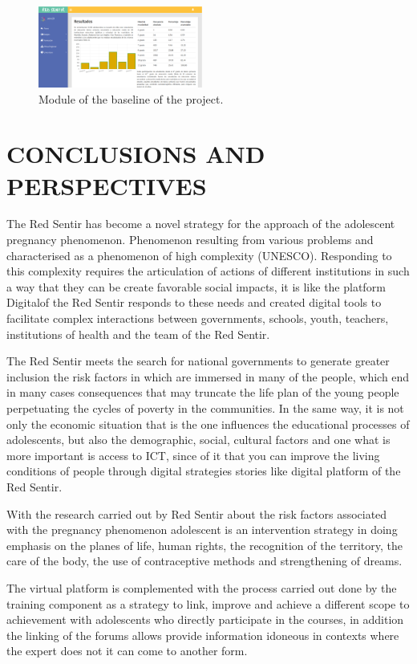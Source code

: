 \documentclass[journal,transmag]{IEEEtran}
\begin{document}
\begin{figure}[t]
\centering
\includegraphics[width=0.48\textwidth]{resultados.eps}
\caption{Module of the baseline of the project.}
\label{fig:lineabase}
\end{figure}

\section{CONCLUSIONS AND PERSPECTIVES}\label{sec:conclusiones}
The Red Sentir has become a novel strategy for the approach of the adolescent pregnancy phenomenon. Phenomenon resulting from various problems and characterised as a phenomenon of high complexity (UNESCO). Responding to this complexity requires the articulation of actions of different institutions in such a way that they can be create favorable social impacts, it is like the platform Digitalof the Red Sentir responds to these needs and created digital tools to facilitate complex interactions between governments, schools, youth, teachers, institutions of health and the team of the Red Sentir.

The Red Sentir meets the search for national governments to generate greater inclusion the risk factors in which are immersed in many of the people, which end in many cases consequences that may truncate the life plan of the young people perpetuating the cycles of poverty in the communities. In the same way, it is not only the economic situation that is the one influences the educational processes of adolescents, but also the demographic, social, cultural factors and one what is more important is access to ICT, since of it that you can improve the living conditions of people through digital strategies stories like digital platform of the Red Sentir.

With the research carried out by Red Sentir about the risk factors associated with the pregnancy phenomenon adolescent is an intervention strategy in doing emphasis on the planes of life, human rights, the recognition of the territory, the care of the body, the use of contraceptive methods and strengthening of dreams.

The virtual platform is complemented with the process carried out done by the training component as a strategy to link, improve and achieve a different scope to achievement with adolescents who directly participate in the courses, in addition the linking of the forums allows provide information idoneous in contexts where the expert does not it can come to another form.
\end{document}
